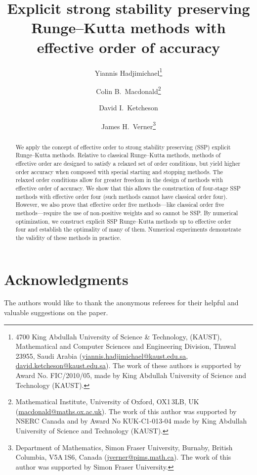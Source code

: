 \documentclass[10pt,a4paper,oneside]{article}
\title{Explicit strong stability preserving Runge--Kutta methods with effective order of accuracy}
\author{
	Yiannis Hadjimichael\footnote{4700 King Abdullah University of Science \& Technology, 
	(KAUST), Mathematical and Computer Sciences and Engineering Division, Thuwal 23955, 
	Saudi Arabia
	(\url{yiannis.hadjimichael@kaust.edu.sa}, 
	\url{david.ketcheson@kaust.edu.sa}).
	The work of these authors is supported by Award No. FIC/2010/05, made by King 
	Abdullah University of Science and Technology (KAUST).}
    	\and 
    	Colin B.~Macdonald\thanks{Mathematical Institute, University of Oxford, OX1\,3LB, UK 
    	(\url{macdonald@maths.ox.ac.uk}).
    	The work of this author was supported by NSERC 
    	Canada and by Award No KUK-C1-013-04 made by King Abdullah University of Science 
    	and Technology (KAUST).}
    	\and 
    	David I.~Ketcheson\footnotemark[1]
    	\and 
    	James H.~Verner\thanks{Department of Mathematics, Simon Fraser University,
    	Burnaby, British Columbia, V5A\,1S6, Canada
    	(\url{jverner@pims.math.ca}).
    	The work of this author was supported by Simon Fraser University.}
}
\numberwithin{theorem}{section}
\numberwithin{equation}{section}
\numberwithin{table}{section}
\numberwithin{figure}{section}
\begin{document}
	\maketitle
	
	
	\begin{abstract}
  		We apply the concept of effective order to strong stability preserving 
  		(SSP) explicit Runge--Kutta methods.
  		Relative to classical Runge--Kutta methods, methods of effective order 
  		are designed to satisfy a relaxed set of order conditions, but yield higher 
  		order accuracy  when composed with special starting and stopping methods. 
         The relaxed order conditions allow for greater freedom in the design
         of methods with effective order of accuracy. 
         We show that this allows the construction of four-stage SSP methods with 
         effective order four (such methods cannot have classical order four). 
         However, we also prove that effective order five methods---like classical
         order five methods---require the use of non-positive weights and so cannot
         be SSP.
         By numerical optimization, we construct explicit SSP Runge--Kutta methods 
         up to effective order four and establish the optimality of many of them.
  		Numerical experiments demonstrate the validity of these methods in
  		practice.
	\end{abstract}

	
	
	
	
	
	
	

	\section*{Acknowledgments}{
		The authors would like to thank the anonymous referees for their helpful 
		and valuable suggestions on the paper.
	}

	
\end{document}
